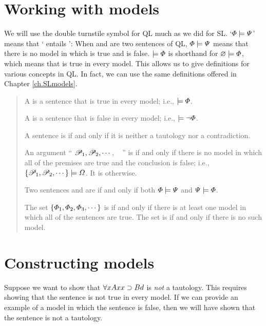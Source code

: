 \section{Working with models}
\label{sec.UsingModels}


We will use the double turnstile symbol for QL much as we did for SL. `$\varPhi{}\models\varPsi{}$' means that `\metaA{} entails \metaB{}': When \metaA{} and \metaB{} are two sentences of QL, $\varPhi{}\models\varPsi{}$ means that there is no model in which \metaA{} is true and \metaB{} is false. $\models\varPhi{}$ is shorthand for $\varnothing\models\varPhi{}$, which means that \metaA{} is true in every model. This allows us to give definitions for various concepts in QL. In fact, we can use the same definitions offered in Chapter \ref{ch.SLmodels}.

\begin{quote}
A  is a sentence \metaA{} that is true in every model; i.e.,  $\models\varPhi{}$.

A  is a sentence \metaA{} that is false in every model; i.e., $\models\neg\varPhi{}$.

A sentence is  if and only if it is neither a tautology nor a contradiction.

An argument `` $\mathscr{P}_1, \mathscr{P}_2, \cdots$, \therefore\ \metaC{} '' is  if and only if there is no model in which all of the premises are true and the conclusion is false; i.e., $\{\mathscr{P}_1,\mathscr{P}_2,\cdots\}\models\varOmega{}$. It is  otherwise.

Two sentences \metaA{} and \metaB{} are  if and only if both $\varPhi{}\models\varPsi{}$ and $\varPsi{}\models\varPhi{}$.

The set $\{\varPhi{}_1,\varPhi{}_2,\varPhi{}_3,\cdots\}$ is  if and only if there is at least one model in which all of the sentences are true. The set is  if and only if there is no such model.

\end{quote}


\section{Constructing models}

Suppose we want to show that $\forall xAxx \supset Bd$ is \emph{not} a tautology. This requires showing that the sentence is not true in every model. If we can provide an example of a model in which the sentence is false, then we will have shown that the sentence is not a tautology.

